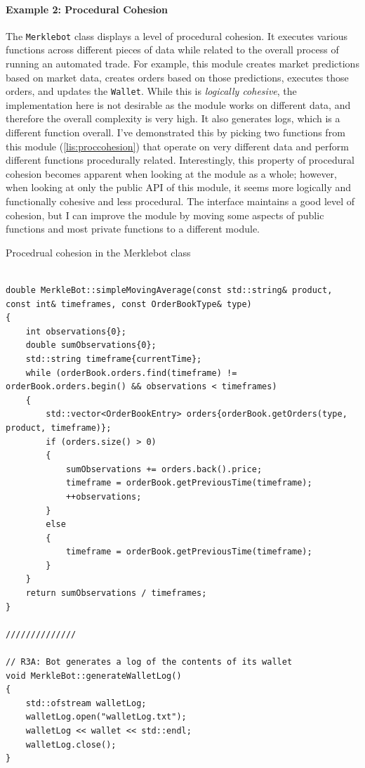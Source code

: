 \paragraph{Example 2: Procedural Cohesion} %
\label{par:procedural_cohesion}
The \texttt{Merklebot} class displays a level of procedural cohesion. It executes various functions across different pieces of data while related to the overall process of running an automated trade. For example, this module creates market predictions based on market data, creates orders based on those predictions, executes those orders, and updates the \texttt{Wallet}. While this is \emph{logically cohesive}, the implementation here is not desirable as the module works on different data, and therefore the overall complexity is very high. It also generates logs, which is a different function overall. I've demonstrated this by picking two functions from this module (\autoref{lis:proccohesion}) that operate on very different data and perform different functions procedurally related. Interestingly, this property of procedural cohesion becomes apparent when looking at the module as a whole; however, when looking at only the public API of this module, it seems more logically and functionally cohesive and less procedural. The interface maintains a good level of cohesion, but I can improve the module by moving some aspects of public functions and most private functions to a different module.
\begin{listing}[h]
	\caption{Procedrual cohesion in the Merklebot class}
	\label{lis:proccohesion}
	\begin{verbatim}

double MerkleBot::simpleMovingAverage(const std::string& product, const int& timeframes, const OrderBookType& type)
{
	int observations{0};
	double sumObservations{0};
	std::string timeframe{currentTime};
	while (orderBook.orders.find(timeframe) != orderBook.orders.begin() && observations < timeframes)
	{
		std::vector<OrderBookEntry> orders{orderBook.getOrders(type, product, timeframe)};
		if (orders.size() > 0)
		{
			sumObservations += orders.back().price;
			timeframe = orderBook.getPreviousTime(timeframe);
			++observations;
		}
		else
		{
			timeframe = orderBook.getPreviousTime(timeframe);
		}
	}
	return sumObservations / timeframes;
}

//////////////

// R3A: Bot generates a log of the contents of its wallet
void MerkleBot::generateWalletLog()
{
	std::ofstream walletLog;
	walletLog.open("walletLog.txt");
	walletLog << wallet << std::endl;
	walletLog.close();
}
	\end{verbatim}
\end{listing}

